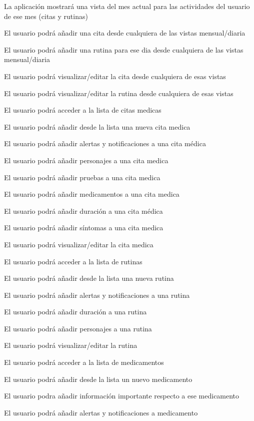 \documentclass[../pfc.tex]{subfiles}
\begin{document}
	La aplicación mostrará una vista del mes actual para las actividades del usuario de ese mes (citas y rutinas)
	
	El usuario podrá añadir una cita desde cualquiera de las vistas mensual/diaria
	
	El usuario podrá añadir una rutina para ese dia desde cualquiera de las vistas mensual/diaria
	
	El usuario podrá visualizar/editar la cita desde cualquiera de esas vistas
	
	El usuario podrá visualizar/editar la rutina desde cualquiera de esas vistas
	
	
	
	El usuario podrá acceder a la lista de citas medicas
	
	El usuario podrá añadir desde la lista una nueva cita medica
	
	El usuario podrá añadir alertas y notificaciones a una cita médica
	
	El usuario podrá añadir personajes a una cita medica
	
	El usuario podrá añadir pruebas a una cita medica
	
	El usuario podrá añadir medicamentos a una cita medica
	
	El usuario podrá añadir duración a una cita médica
	
	El usuario podrá añadir síntomas a una cita medica
	
	El usuario podrá visualizar/editar la cita medica
	
	
	
	El usuario podrá acceder a la lista de rutinas
	
	El usuario podrá añadir desde la lista una nueva rutina
	
	El usuario podrá añadir alertas y notificaciones a una rutina
	
	El usuario podrá añadir duración a una rutina
	
	El usuario podrá añadir personajes a una rutina
	
	El usuario podrá visualizar/editar la rutina
	
	
	
	El usuario podrá acceder a la lista de medicamentos
	
	El usuario podrá añadir desde la lista un nuevo medicamento
	
	El usuario podra añadir información importante respecto a ese medicamento
	
	El usuario podrá añadir alertas y notificaciones a medicamento
	
\end{document}

